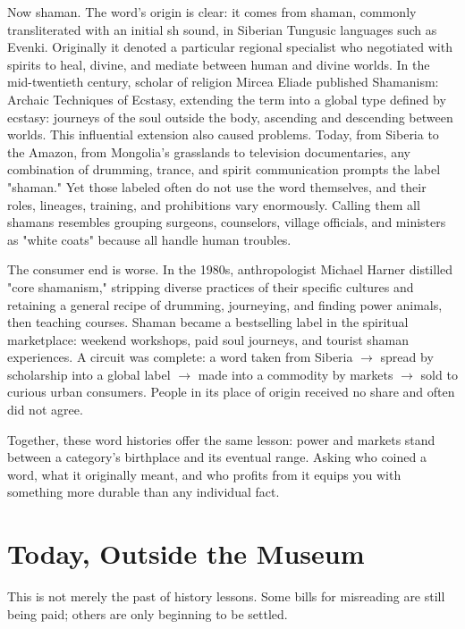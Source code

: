 Now shaman. The word's origin is clear: it comes from shaman, commonly transliterated with an initial sh sound, in Siberian Tungusic languages such as Evenki. Originally it denoted a particular regional specialist who negotiated with spirits to heal, divine, and mediate between human and divine worlds. In the mid-twentieth century, scholar of religion Mircea Eliade published Shamanism: Archaic Techniques of Ecstasy, extending the term into a global type defined by ecstasy: journeys of the soul outside the body, ascending and descending between worlds. This influential extension also caused problems. Today, from Siberia to the Amazon, from Mongolia's grasslands to television documentaries, any combination of drumming, trance, and spirit communication prompts the label "shaman." Yet those labeled often do not use the word themselves, and their roles, lineages, training, and prohibitions vary enormously. Calling them all shamans resembles grouping surgeons, counselors, village officials, and ministers as "white coats" because all handle human troubles.

The consumer end is worse. In the 1980s, anthropologist Michael Harner distilled "core shamanism," stripping diverse practices of their specific cultures and retaining a general recipe of drumming, journeying, and finding power animals, then teaching courses. Shaman became a bestselling label in the spiritual marketplace: weekend workshops, paid soul journeys, and tourist shaman experiences. A circuit was complete: a word taken from Siberia $\rightarrow$ spread by scholarship into a global label $\rightarrow$ made into a commodity by markets $\rightarrow$ sold to curious urban consumers. People in its place of origin received no share and often did not agree.

Together, these word histories offer the same lesson: power and markets stand between a category's birthplace and its eventual range. Asking who coined a word, what it originally meant, and who profits from it equips you with something more durable than any individual fact.

\section{Today, Outside the Museum}
This is not merely the past of history lessons. Some bills for misreading are still being paid; others are only beginning to be settled.

